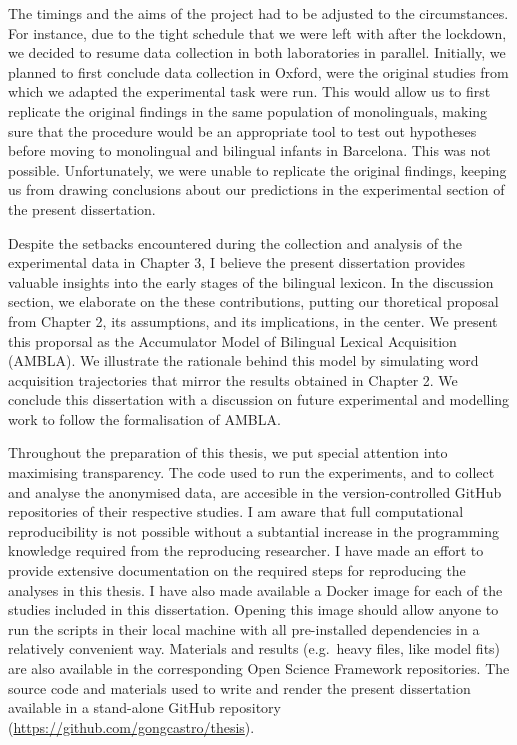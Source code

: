 \documentclass[
  12pt,
  b5paperpaper,
  twoside]{scrreprt}
\begin{document}
\begin{spacing}{1.5}
{The timings and the aims of the project had to be adjusted to the
circumstances. For instance, due to the tight schedule that we were left
with after the lockdown, we decided to resume data collection in both
laboratories in parallel. Initially, we planned to first conclude data
collection in Oxford, were the original studies from which we adapted
the experimental task were run. This would allow us to first replicate
the original findings in the same population of monolinguals, making
sure that the procedure would be an appropriate tool to test out
hypotheses before moving to monolingual and bilingual infants in
Barcelona. This was not possible. Unfortunately, we were unable to
replicate the original findings, keeping us from drawing conclusions
about our predictions in the experimental section of the present
dissertation.

Despite the setbacks encountered during the collection and analysis of
the experimental data in Chapter 3, I believe the present dissertation
provides valuable insights into the early stages of the bilingual
lexicon. In the discussion section, we elaborate on the these
contributions, putting our thoretical proposal from Chapter 2, its
assumptions, and its implications, in the center. We present this
proporsal as the Accumulator Model of Bilingual Lexical Acquisition
(AMBLA). We illustrate the rationale behind this model by simulating
word acquisition trajectories that mirror the results obtained in
Chapter 2. We conclude this dissertation with a discussion on future
experimental and modelling work to follow the formalisation of AMBLA.

Throughout the preparation of this thesis, we put special attention into
maximising transparency. The code used to run the experiments, and to
collect and analyse the anonymised data, are accesible in the
version-controlled GitHub repositories of their respective studies. I am
aware that full computational reproducibility is not possible without a
subtantial increase in the programming knowledge required from the
reproducing researcher. I have made an effort to provide extensive
documentation on the required steps for reproducing the analyses in this
thesis. I have also made available a Docker image for each of the
studies included in this dissertation. Opening this image should allow
anyone to run the scripts in their local machine with all pre-installed
dependencies in a relatively convenient way. Materials and results
(e.g.~heavy files, like model fits) are also available in the
corresponding Open Science Framework repositories. The source code and
materials used to write and render the present dissertation available in
a stand-alone GitHub repository
(\url{https://github.com/gongcastro/thesis}).}
\clearpage

\end{spacing}\ifdefined\Shaded\renewenvironment{Shaded}{\begin{tcolorbox}[borderline west={3pt}{0pt}{shadecolor}, boxrule=0pt, colback={codebgcolor}, enhanced, sharp corners, frame hidden, breakable]}{\end{tcolorbox}}\fi
\end{document}
